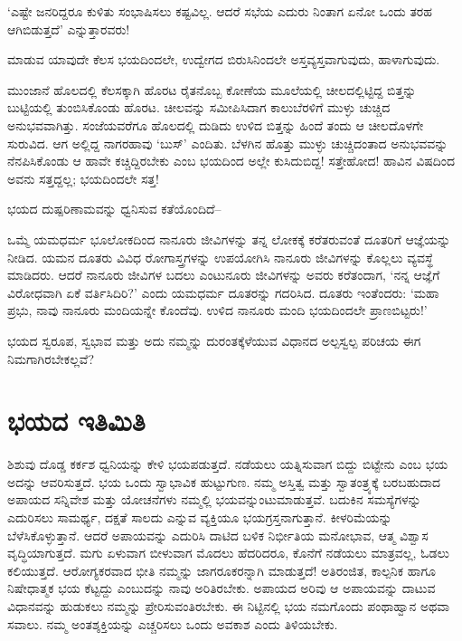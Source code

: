‘ಎಷ್ಟೇ ಜನರಿದ್ದರೂ ಕುಳಿತು ಸಂಭಾಷಿಸಲು ಕಷ್ಟವಿಲ್ಲ. ಆದರೆ ಸಭೆಯ ಎದುರು ನಿಂತಾಗ ಏನೋ ಒಂದು ತರಹ ಆಗಿಬಿಡುತ್ತದೆ’ ಎನ್ನುತ್ತಾರವರು!

ಮಾಡುವ ಯಾವುದೇ ಕೆಲಸ ಭಯದಿಂದಲೇ, ಉದ್ವೇಗದ ಬಿರುಸಿನಿಂದಲೇ ಅಸ್ತವ್ಯಸ್ತವಾಗುವುದು, ಹಾಳಾಗುವುದು.

ಮುಂಜಾನೆ ಹೊಲದಲ್ಲಿ ಕೆಲಸಕ್ಕಾಗಿ ಹೊರಟ ರೈತನೊಬ್ಬ ಕೋಣೆಯ ಮೂಲೆಯಲ್ಲಿ ಚೀಲ\-ದಲ್ಲಿಟ್ಟಿದ್ದ ಬಿತ್ತನ್ನು ಬುಟ್ಟಿಯಲ್ಲಿ ತುಂಬಿಸಿಕೊಂಡು ಹೊರಟ. ಚೀಲವನ್ನು ಸಮೀಪಿಸಿದಾಗ ಕಾಲುಬೆರಳಿಗೆ ಮುಳ್ಳು ಚುಚ್ಚಿದ ಅನುಭವವಾಗಿತ್ತು. ಸಂಜೆಯವರೆಗೂ ಹೊಲದಲ್ಲಿ ದುಡಿದು ಉಳಿದ ಬಿತ್ತನ್ನು ಹಿಂದೆ ತಂದು ಆ ಚೀಲದೊಳಗೇ ಸುರುವಿದ. ಆಗ ಅಲ್ಲಿದ್ದ ನಾಗರಹಾವು ‘ಬುಸ್​’ ಎಂದಿತು. ಬೆಳಗಿನ ಹೊತ್ತು ಮುಳ್ಳು ಚುಚ್ಚಿದಂತಾದ ಅನುಭವವನ್ನು ನೆನಪಿಸಿಕೊಂಡು ಆ ಹಾವೇ ಕಚ್ಚಿದ್ದಿರಬೇಕು ಎಂಬ ಭಯದಿಂದ ಅಲ್ಲೇ ಕುಸಿದುಬಿದ್ದ! ಸತ್ತೇಹೋದ! ಹಾವಿನ ವಿಷದಿಂದ ಅವನು ಸತ್ತದ್ದಲ್ಲ; ಭಯದಿಂದಲೇ ಸತ್ತ!

ಭಯದ ದುಷ್ಪರಿಣಾಮವನ್ನು ಧ್ವನಿಸುವ ಕತೆಯೊಂದಿದೆ–

ಒಮ್ಮೆ ಯಮಧರ್ಮ ಭೂಲೋಕದಿಂದ ನಾನೂರು ಜೀವಿಗಳನ್ನು ತನ್ನ ಲೋಕಕ್ಕೆ ಕರೆತರುವಂತೆ ದೂತರಿಗೆ ಆಜ್ಞೆಯನ್ನು ನೀಡಿದ. ಯಮನ ದೂತರು ವಿವಿಧ ರೋಗಾಸ್ತ್ರಗಳನ್ನು ಉಪಯೋಗಿಸಿ ನಾನೂರು ಜೀವಿಗಳನ್ನು ಕೊಲ್ಲಲು ವ್ಯವಸ್ಥೆ ಮಾಡಿದರು. ಆದರೆ ನಾನೂರು ಜೀವಿಗಳ ಬದಲು ಎಂಟುನೂರು ಜೀವಿಗಳನ್ನು ಅವರು ಕರೆತಂದಾಗ, ‘ನನ್ನ ಆಜ್ಞೆಗೆ ವಿರೋಧವಾಗಿ ಏಕೆ ವರ್ತಿಸಿದಿರಿ?’ ಎಂದು ಯಮಧರ್ಮ ದೂತರನ್ನು ಗದರಿಸಿದ. ದೂತರು ಇಂತೆಂದರು: ‘ಮಹಾ ಪ್ರಭು, ನಾವು ನಾನೂರು ಮಂದಿಯನ್ನೇ ಕೊಂದೆವು. ಉಳಿದ ನಾನೂರು ಮಂದಿ ಭಯದಿಂದಲೇ ಪ್ರಾಣಬಿಟ್ಟರು!’

ಭಯದ ಸ್ವರೂಪ, ಸ್ವಭಾವ ಮತ್ತು ಅದು ನಮ್ಮನ್ನು ದುರಂತಕ್ಕೆಳೆಯುವ ವಿಧಾನದ ಅಲ್ಪಸ್ವಲ್ಪ ಪರಿಚಯ ಈಗ ನಿಮಗಾಗಿರಬೇಕಲ್ಲವೆ?


\section*{ಭಯದ ಇತಿಮಿತಿ}


ಶಿಶುವು ದೊಡ್ಡ ಕರ್ಕಶ ಧ್ವನಿಯನ್ನು ಕೇಳಿ ಭಯಪಡುತ್ತದೆ. ನಡೆಯಲು ಯತ್ನಿಸುವಾಗ ಬಿದ್ದು ಬಿಟ್ಟೇನು ಎಂಬ ಭಯ ಅದನ್ನು ಆವರಿಸುತ್ತದೆ. ಭಯ ಒಂದು ಸ್ವಾಭಾವಿಕ ಹುಟ್ಟುಗುಣ. ನಮ್ಮ ಅಸ್ತಿತ್ವ ಮತ್ತು ಸ್ವಾತಂತ್ರ್ಯಕ್ಕೆ ಬರಬಹುದಾದ ಅಪಾಯದ ಸನ್ನಿವೇಶ ಮತ್ತು ಯೋಚನೆಗಳು ನಮ್ಮಲ್ಲಿ ಭಯವನ್ನುಂಟುಮಾಡುತ್ತವೆ. ಬದುಕಿನ ಸಮಸ್ಯೆಗಳನ್ನು ಎದುರಿಸಲು ಸಾಮರ್ಥ್ಯ, ದಕ್ಷತೆ ಸಾಲದು ಎನ್ನುವ ವ್ಯಕ್ತಿಯೂ ಭಯಗ್ರಸ್ತನಾಗುತ್ತಾನೆ. ಕೀಳರಿಮೆಯನ್ನು ಬೆಳೆಸಿಕೊಳ್ಳುತ್ತಾನೆ. ಆದರೆ ಅಪಾಯವನ್ನು ಎದುರಿಸಿ ದಾಟಿದ ಬಳಿಕ ನಿರ್ಭೀತಿಯ ಮನೋಭಾವ, ಆತ್ಮ ವಿಶ್ವಾಸ ವೃದ್ಧಿಯಾಗುತ್ತದೆ. ಮಗು ಏಳುವಾಗ ಬೀಳುವಾಗ ಮೊದಲು ಹೆದರಿದರೂ, ಕೊನೆಗೆ ನಡೆಯಲು ಮಾತ್ರವಲ್ಲ, ಓಡಲು ಕಲಿಯುತ್ತದೆ. ಆರೋಗ್ಯಕರವಾದ ಭೀತಿ ನಮ್ಮನ್ನು ಜಾಗರೂಕರನ್ನಾಗಿ ಮಾಡುತ್ತದೆ! ಅತಿರಂಜಿತ, ಕಾಲ್ಪನಿಕ ಹಾಗೂ ನಿಷೇಧಾತ್ಮಕ ಭಯ ಕೆಟ್ಟದ್ದು ಎಂಬುದನ್ನು ನಾವು ಅರಿತಿರಬೇಕು. ಅಪಾಯದ ಅರಿವು ಆ ಅಪಾಯವನ್ನು ದಾಟುವ ವಿಧಾನವನ್ನು ಹುಡುಕಲು ನಮ್ಮನ್ನು ಪ್ರೇರಿಸುವಂತಿರಬೇಕು. ಈ ನಿಟ್ಟಿನಲ್ಲಿ ಭಯ ನಮಗೊಂದು ಪಂಥಾಹ್ವಾನ ಅಥವಾ ಸವಾಲು. ನಮ್ಮ ಅಂತಶ್ಶಕ್ತಿಯನ್ನು ಎಚ್ಚರಿಸಲು ಒಂದು ಅವಕಾಶ ಎಂದು ತಿಳಿಯಬೇಕು.


